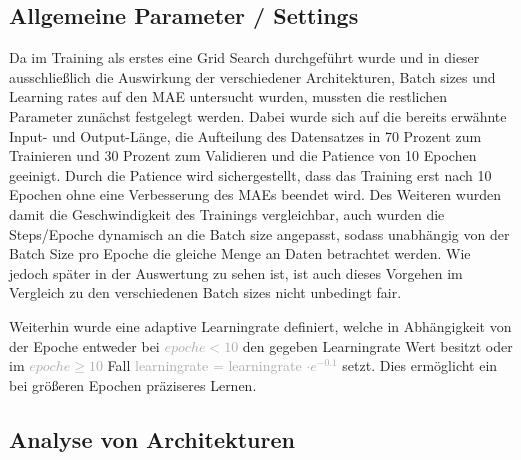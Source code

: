 \documentclass[manuscript,screen,review]{acmart} %
\begin{document}
\subsection{Allgemeine Parameter / Settings} 

Da im Training als erstes eine Grid Search durchgeführt wurde und in dieser ausschließlich die Auswirkung der verschiedener Architekturen, Batch sizes und Learning rates auf den MAE untersucht wurden, mussten die restlichen Parameter zunächst festgelegt werden. Dabei wurde sich auf die bereits erwähnte Input- und Output-Länge, die Aufteilung des Datensatzes in 70 Prozent zum Trainieren und 30 Prozent zum Validieren und die Patience von 10 Epochen geeinigt. Durch die Patience wird sichergestellt, dass das Training erst nach 10 Epochen ohne eine Verbesserung des MAEs beendet wird. Des Weiteren wurden damit die Geschwindigkeit des Trainings vergleichbar, auch wurden die Steps/Epoche dynamisch an die Batch size angepasst, sodass unabhängig von der Batch Size pro Epoche die gleiche Menge an Daten betrachtet werden. Wie jedoch später in der Auswertung zu sehen ist, ist auch dieses Vorgehen im Vergleich zu den verschiedenen Batch sizes nicht unbedingt fair. 

 Weiterhin wurde eine adaptive Learningrate definiert, welche in Abhängigkeit von der Epoche entweder bei \textcolor{darkgray}{$epoche < 10$} den gegeben Learningrate Wert besitzt oder im \textcolor{darkgray}{$epoche \geq 10$} Fall \textcolor{darkgray}{learningrate = learningrate $\cdot e^{-0.1}$} setzt. Dies ermöglicht ein bei größeren Epochen präziseres Lernen.


\subsection{Analyse von Architekturen}
\end{document}
